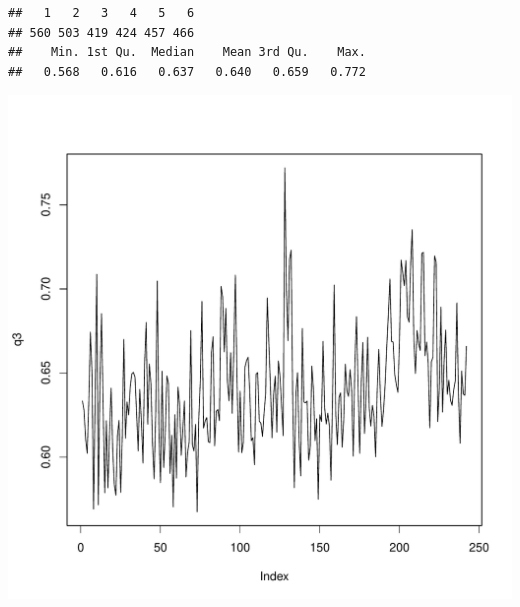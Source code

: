 \documentclass[12pt,english,french,twoside]{report}\usepackage[]{graphicx}\usepackage[]{color}
\makeatletter
\def\maxwidth{ %
  \ifdim\Gin@nat@width>\linewidth
    \linewidth
  \else
    \Gin@nat@width
  \fi
}
\newenvironment{kframe}{%
 \def\at@end@of@kframe{}%
 \ifinner\ifhmode%
  \def\at@end@of@kframe{\end{minipage}}%
  \begin{minipage}{\columnwidth}%
 \fi\fi%
 \def\FrameCommand##1{\hskip\@totalleftmargin \hskip-\fboxsep
 \colorbox{shadecolor}{##1}\hskip-\fboxsep
     \hskip-\linewidth \hskip-\@totalleftmargin \hskip\columnwidth}%
 \MakeFramed {\advance\hsize-\width
   \@totalleftmargin\z@ \linewidth\hsize
   \@setminipage}}%
 {\par\unskip\endMakeFramed%
 \at@end@of@kframe}
\newenvironment{knitrout}{}{} %
\makeatother
\begin{document}
\begin{knitrout}
\color{fgcolor}\begin{kframe}
\begin{verbatim}
##   1   2   3   4   5   6 
## 560 503 419 424 457 466
##    Min. 1st Qu.  Median    Mean 3rd Qu.    Max. 
##   0.568   0.616   0.637   0.640   0.659   0.772
\end{verbatim}
\end{kframe}
\includegraphics[width=\maxwidth]{figure/retour_dom} 

\end{knitrout}
\end{document}
